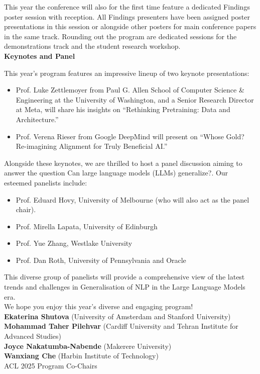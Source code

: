 This year the conference will also for the first time feature a dedicated Findings poster session with reception. All Findings presenters have been assigned poster presentations in this session or alongside other posters for main conference papers in the same track.
Rounding out the program are dedicated sessions for the demonstrations track and the student research workshop.\\


\textbf{Keynotes and Panel}

This year’s program features an impressive lineup of two keynote presentations:
\begin{itemize}
\item Prof. Luke Zettlemoyer from Paul G. Allen School of Computer Science & Engineering at the University of Washington, and a Senior Research Director at Meta, will share his insights on “Rethinking Pretraining: Data and Architecture.”
\item Prof. Verena Rieser from Google DeepMind will present on “Whose Gold? Re-imagining Alignment for Truly Beneficial AI.”
\end{itemize}

Alongside these keynotes, we are thrilled to host a panel discussion aiming to answer the question Can large language models (LLMs) generalize?. Our esteemed panelists include:
\begin{itemize}
\item Prof. Eduard Hovy, University of Melbourne (who will also act as the panel chair).
\item Prof. Mirella Lapata, University of Edinburgh
\item Prof. Yue Zhang, Westlake University
\item Prof. Dan Roth, University of Pennsylvania and Oracle
\end{itemize}

This diverse group of panelists will provide a comprehensive view of the latest trends and challenges in Generalisation of NLP in the Large Language Models era. \\

We hope you enjoy this year’s diverse and engaging program!\\
\textbf{Ekaterina Shutova} (University of Amsterdam and Stanford University)\\
\textbf{Mohammad Taher Pilehvar} (Cardiff University and Tehran Institute for Advanced Studies)\\
\textbf{Joyce Nakatumba-Nabende} (Makerere University)\\
\textbf{Wanxiang Che} (Harbin Institute of Technology)\\
ACL 2025 Program Co-Chairs
